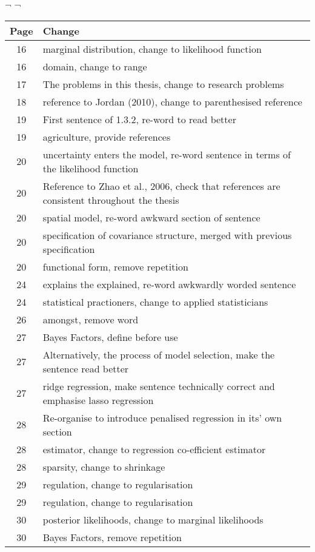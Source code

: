 \documentclass{amsart}
\begin{document}
¬
¬

\begin{tabular}{cl}
Page & Change \\
\hline
 16  &  marginal distribution, change to likelihood function\\
 16  &  domain, change to range\\
 17  &  The problems in this thesis, change to research problems\\
 18  &  reference to Jordan (2010), change to parenthesised reference\\
 19  &  First sentence of 1.3.2, re-word to read better\\
 19  &  agriculture, provide references\\
 20  &  uncertainty enters the model, re-word sentence in terms of the
			likelihood function\\
 20  &  Reference to Zhao et al., 2006, check that references are consistent
			throughout the thesis\\
 20  &  spatial model, re-word awkward section of sentence\\
 20  &  specification of covariance structure, merged with previous
			specification\\
 20  &  functional form, remove repetition\\
 24  &  explains the explained, re-word awkwardly worded sentence\\
 24  &  statistical practioners, change to applied statisticians\\
 26  &  amongst, remove word\\
 27  &  Bayes Factors, define before use\\
 27  &  Alternatively, the process of model selection, make the sentence
			read better\\
 27  &  ridge regression, make sentence technically correct and emphasise
lasso regression\\
 28  &  Re-organise to introduce penalised regression in its' own section\\
 28  &  estimator, change to regression co-efficient estimator\\
 28  &  sparsity, change to shrinkage\\
 29  &  regulation, change to regularisation\\
 29  &  regulation, change to regularisation\\
 30  &  posterior likelihoods, change to marginal likelihoods \\
 30  &  Bayes Factors, remove repetition\\

\end{tabular}
\end{document}
